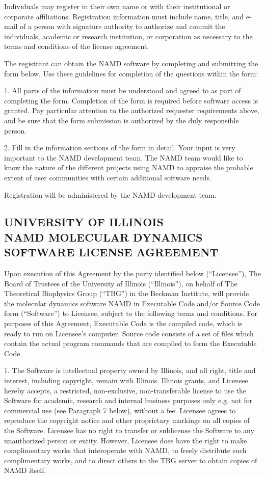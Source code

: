 Individuals may register in their own name or with their institutional or
corporate affiliations. Registration information must include name, title, 
and e-mail of a person with signature authority to authorize and commit the
individuals, academic or research institution, or corporation as necessary 
to the terms and conditions of the license agreement.

The registrant can obtain the NAMD software by completing and submitting the
form below. Use these guidelines for completion of the questions within the
form:

1. All parts of the information must be understood and agreed to as part of
completing the form. Completion of the form is required before software 
access is granted. Pay particular attention to the authorized requester 
requirements above, and be sure that the form submission is authorized 
by the duly responsible person.

2. Fill in the information sections of the form in detail. Your input 
is very important to the NAMD development team. The NAMD team would like 
to know the nature of the different projects using NAMD to appraise the 
probable extent of user communities with certain additional software needs.

Registration will be administered by the NAMD development team.

\newpage
\subsection*{UNIVERSITY OF ILLINOIS \\
NAMD MOLECULAR DYNAMICS SOFTWARE LICENSE AGREEMENT}

Upon execution of this Agreement by the party identified below (``Licensee''),
The Board of Trustees of the University of Illinois (``Illinois''), on 
behalf of The Theoretical Biophysics Group (``TBG'') in the Beckman Institute,
will provide the molecular dynamics software NAMD in Executable 
Code and/or Source Code form (``Software'') to Licensee, subject to 
the following terms and conditions. For purposes of this Agreement, 
Executable Code is the compiled code, which is ready to run on Licensee's 
computer. Source code consists of a set of files which contain the 
actual program commands that are compiled to form the Executable Code.

1. The Software is intellectual property owned by Illinois, and all 
right, title and interest, including copyright, remain with Illinois. 
Illinois grants, and Licensee hereby accepts, a restricted, non-exclusive, 
non-transferable license to use the Software for academic, research 
and internal business purposes only e.g. not for commercial use 
(see Paragraph 7 below), without a fee. Licensee agrees to reproduce 
the copyright notice and other proprietary markings on all copies of 
the Software. Licensee has no right to transfer or sublicense the 
Software to any unauthorized person or entity. However, Licensee does 
have the right to make complimentary works that interoperate with NAMD, 
to freely distribute such complimentary works, and to direct others 
to the TBG server to obtain copies of NAMD itself.

